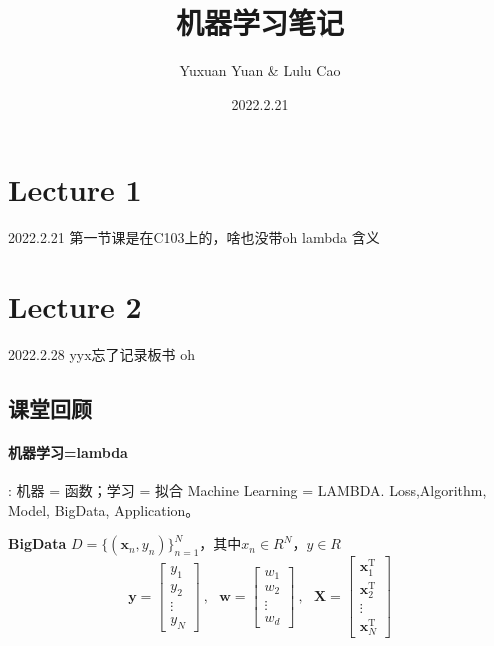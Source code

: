 \documentclass[UTF8]{ctexart}
\title{机器学习笔记}
\author{Yuxuan Yuan \& Lulu Cao}
\date{2022.2.21}
\numberwithin{equation}{section}
\begin{document}
\maketitle

\newpage
\tableofcontents

\newpage

\section{Lecture 1}
2022.2.21
第一节课是在C103上的，啥也没带oh
lambda 含义


\newpage
\section{Lecture 2}
2022.2.28
yyx忘了记录板书 oh

\subsection{课堂回顾}
\paragraph{机器学习=lambda} 
 : 机器 = 函数；学习 = 拟合 \newline   
Machine Learning = LAMBDA. Loss,Algorithm, Model, BigData, Application。

\textbf{BigData} $D=\{( \boldsymbol{x}_{n},y_n)\}_{n=1}^{N}$，其中$x_n \in R^N$，$y\in R$
\begin{equation*}
    \boldsymbol{y}=\left[\begin{array}{l}
                            y_{1} \\
                            y_{2} \\
                            \vdots \\
                            y_{N}
                        \end{array}\right]
        \ ,  \ \ \
    \boldsymbol{w}=\left[\begin{array}{l}
                            w_{1} \\
                            w_{2} \\
                            \vdots \\
                            w_{d}
                        \end{array}\right]
        \ ,  \ \ \
    \boldsymbol{X}=\left[\begin{array}{c}
                            \boldsymbol{x}_{1}^{\mathrm{T}} \\
                            \boldsymbol{x}_{2}^{\mathrm{T}} \\
                            \vdots \\
                            \boldsymbol{x}_{N}^{\mathrm{T}}
                        \end{array}\right]
\end{equation*}
\end{document}
